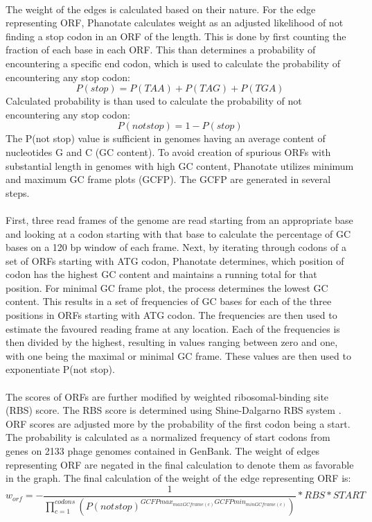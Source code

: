 \paragraph*{}
The weight of the edges is calculated based on their nature. For the edge representing ORF, Phanotate calculates weight as an adjusted likelihood of not finding a stop codon in an ORF of the length. This is done by first counting the fraction of each base in each ORF. This than determines a probability of encountering a specific end codon, which is used to calculate the probability of encountering any stop codon:
\[ P(stop) = P(TAA) + P(TAG) + P(TGA) \]
Calculated probability is than used to calculate the probability of not encountering any stop codon:
\[ P(not stop) = 1 - P(stop) \]
The P(not stop) value is sufficient in genomes having an average content of nucleotides G and C (GC content). To avoid creation of spurious ORFs with substantial length in genomes with high GC content, Phanotate utilizes minimum and maximum GC frame plots (GCFP). The GCFP are generated in several steps. 
\paragraph*{}
First, three read frames of the genome are read starting from an appropriate base and looking at a codon starting with that base to calculate the percentage of GC bases on a 120 bp window of each frame. Next, by iterating through codons of a set of ORFs starting with ATG codon, Phanotate determines, which position of codon has the highest GC content and maintains a running total for that position. For minimal GC frame plot, the process determines the lowest GC content. This results in a set of frequencies of GC bases for each of the three positions in ORFs starting with ATG codon. The frequencies are then used to estimate the favoured reading frame at any location. Each of the frequencies is then divided by the highest, resulting in values ranging between zero and one, with one being the maximal or minimal GC frame. These values are then used to exponentiate P(not stop).
\paragraph*{}
The scores of ORFs are further modified by weighted ribosomal-binding site (RBS) score. The RBS score is determined using Shine-Dalgarno RBS system \cite{hyatt2010prodigal}. ORF scores are adjusted more by the probability of the first codon being a start. The probability is calculated as a normalized frequency of start codons from genes on 2133 phage genomes contained in GenBank. The weight of edges representing ORF are negated in the final calculation to denote them as favorable in the graph. The final calculation of the weight of the edge representing ORF is:
\[ w_{orf} = - \frac{1}{\prod\limits_{c=1}^{codons}(P(not stop)^{GCFPmax_{maxGCframe(c)} GCFPmin_{minGCframe(c)}})} * RBS * START \]
